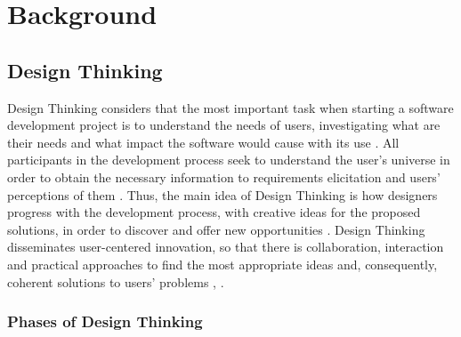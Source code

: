 \documentclass[conference]{IEEEtran}
\begin{document}
\section{Background}
\label{back}
\subsection{Design Thinking}


Design Thinking considers that the most important task when starting a software development project is to understand the needs of users, investigating what are their needs and what impact the software would cause with its use \cite{DBLP:conf/icexss/TorresM20}. All participants in the development process seek to understand the user's universe in order to obtain the necessary information to requirements elicitation and users' perceptions of them \cite{DBLP:books/lib/brown2009change}. Thus, the main idea of Design Thinking is how designers progress with the development process, with creative ideas for the proposed solutions, in order to discover and offer new opportunities \cite{DBLP:conf/hci/AdikariMC13}. Design Thinking disseminates user-centered innovation, so that there is collaboration, interaction and practical approaches to find the most appropriate ideas and, consequently, coherent solutions to users' problems \cite{DBLP:books/lib/brown2009change}, \cite{DBLP:journals/ited/SeidelMF20}.

\subsubsection{Phases of Design Thinking}
\end{document}

